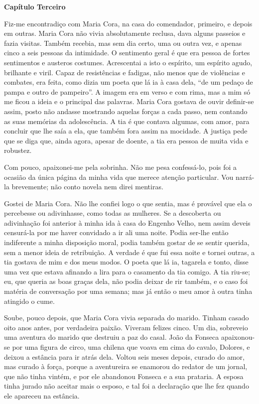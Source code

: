 \textbf{Capítulo Terceiro}

Fiz-me encontradiço com Maria Cora, na casa do comendador, primeiro, e
depois em outras. Maria Cora não vivia absolutamente reclusa, dava
alguns passeios e fazia visitas. Também recebia, mas sem dia certo, uma
ou outra vez, e apenas cinco a seis pessoas da intimidade. O sentimento
geral é que era pessoa de fortes sentimentos e austeros costumes.
Acrescentai a isto o espírito, um espírito agudo, brilhante e viril.
Capaz de resistências e fadigas, não menos que de violências e combates,
era feita, como dizia um poeta que lá ia à casa dela, ``de um pedaço de
pampa e outro de pampeiro''. A imagem era em verso e com rima, mas a mim
só me ficou a ideia e o principal das palavras. Maria Cora gostava de
ouvir definir-se assim, posto não andasse mostrando aquelas forças a
cada passo, nem contando as suas memórias da adolescência. A tia é que
contava algumas, com amor, para concluir que lhe saía a ela, que também
fora assim na mocidade. A justiça pede que se diga que, ainda agora,
apesar de doente, a tia era pessoa de muita vida e robustez.

Com pouco, apaixonei-me pela sobrinha. Não me pesa confessá-lo, pois foi
a ocasião da única página da minha vida que merece atenção particular.
Vou narrá-la brevemente; não conto novela nem direi mentiras.

Gostei de Maria Cora. Não lhe confiei logo o que sentia, mas é provável
que ela o percebesse ou adivinhasse, como todas as mulheres. Se a
descoberta ou adivinhação foi anterior à minha ida à casa do Engenho
Velho, nem assim deveis censurá-la por me haver convidado a ir ali uma
noite. Podia ser-lhe então indiferente a minha disposição moral, podia
também gostar de se sentir querida, sem a menor ideia de retribuição. A
verdade é que fui essa noite e tornei outras, a tia gostava de mim e dos
meus modos. O poeta que lá ia, tagarela e tonto, disse uma vez que
estava afinando a lira para o casamento da tia comigo. A tia riu-se; eu,
que queria as boas graças dela, não podia deixar de rir também, e o caso
foi matéria de conversação por uma semana; mas já então o meu amor à
outra tinha atingido o cume.

Soube, pouco depois, que Maria Cora vivia separada do marido. Tinham
casado oito anos antes, por verdadeira paixão. Viveram felizes cinco. Um
dia, sobreveio uma aventura do marido que destruiu a paz do casal. João
da Fonseca apaixonou-se por uma figura de circo, uma chilena que voava
em cima do cavalo, Dolores, e deixou a estância para ir atrás dela.
Voltou seis meses depois, curado do amor, mas curado à força, porque a
aventureira se enamorou do redator de um jornal, que não tinha vintém, e
por ele abandonou Fonseca e a sua prataria. A esposa tinha jurado não
aceitar mais o esposo, e tal foi a declaração que lhe fez quando ele
apareceu na estância.

